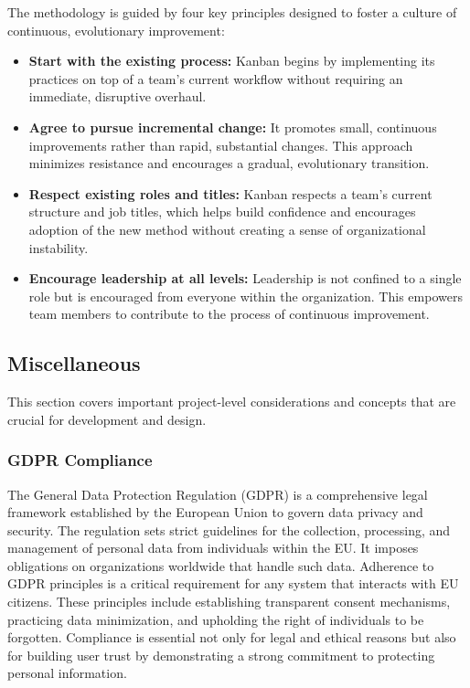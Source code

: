 The methodology is guided by four key principles designed to foster a culture of continuous, evolutionary improvement:
\begin{itemize}
  \item \textbf{Start with the existing process:} Kanban begins by implementing its practices on top of a team's current workflow without requiring an immediate, disruptive overhaul.
  \item \textbf{Agree to pursue incremental change:} It promotes small, continuous improvements rather than rapid, substantial changes. This approach minimizes resistance and encourages a gradual, evolutionary transition.
  \item \textbf{Respect existing roles and titles:} Kanban respects a team's current structure and job titles, which helps build confidence and encourages adoption of the new method without creating a sense of organizational instability.
  \item \textbf{Encourage leadership at all levels:} Leadership is not confined to a single role but is encouraged from everyone within the organization. This empowers team members to contribute to the process of continuous improvement.
\end{itemize}

\subsection{Miscellaneous}
This section covers important project-level considerations and concepts that are crucial for development and design.

\subsubsection{GDPR Compliance}
The General Data Protection Regulation (GDPR) \cite{gdpr2025whatisit} is a comprehensive legal framework established by the European Union to govern data privacy and security. The regulation sets strict guidelines for the collection, processing, and management of personal data from individuals within the EU. It imposes obligations on organizations worldwide that handle such data.
Adherence to GDPR principles is a critical requirement for any system that interacts with EU citizens. These principles include establishing transparent consent mechanisms, practicing data minimization, and upholding the right of individuals to be forgotten. Compliance is essential not only for legal and ethical reasons but also for building user trust by demonstrating a strong commitment to protecting personal information.

